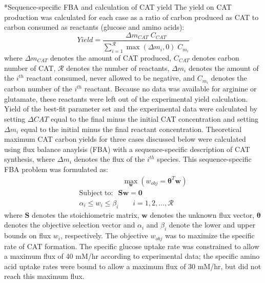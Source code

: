 \documentclass[12pt]{article}
\makeatletter
\renewcommand\subsection{\@startsection
	{subsection}{2}{0mm}
	{-0.05in}
	{-0.5\baselineskip}
	{\normalfont\normalsize\bfseries}}
\makeatother
\begin{document}
\subsection*{Sequence-specific FBA and calculation of CAT yield}
The yield on CAT production was calculated for each case as a ratio of carbon produced as CAT to carbon consumed as reactants (glucose and amino acids):
\begin{equation}\label{eqn:yield-definition}
	Yield=\frac{\Delta m_{CAT}\;C_{CAT}}{\sum_{i=1}^{\mathcal{R}}\max(\Delta m_{i},0)\;C_{m_i}}
\end{equation}
where $\Delta m_{CAT}$ denotes the amount of CAT produced, $C_{CAT}$ denotes carbon number of CAT, $\mathcal{R}$ denotes the number of reactants, $\Delta m_{i}$ denotes the amount of the $i^{th}$ reactant consumed, never allowed to be negative, and $C_{m_i}$ denotes the carbon number of the $i^{th}$ reactant.
Because no data was available for arginine or glutamate, these reactants were left out of the experimental yield calculation.
Yield of the best-fit parameter set and the experimental data were calculated by setting $\Delta CAT$ equal to the final minus the initial CAT concentration and setting $\Delta m_{i}$ equal to the initial minus the final reactant concentration.
Theoretical maximum CAT carbon yields for three cases discussed below were calculated using flux balance anaylsis (FBA) with a sequence-specific description of CAT synthesis, where $\Delta m_{i}$ denotes the flux of the $i^{th}$ species.
This sequence-specific FBA \citep{Allen:2003aa} problem was formulated as:
\begin{equation}\nonumber
 \begin{multlined}
	\qquad \qquad \qquad \max_{\boldsymbol{w}}{} \! \left( w_{obj} = \mathbf{\boldsymbol{\theta}}^T \boldsymbol{w} \right) \\
	\mathrm{Subject \; to:}
	 \; \; \mathbf{S}\mathbf{w}=\mathbf{0} \\
\alpha_i \leq w_i \leq \beta_i  \qquad i=1,2,\hdots,\mathcal{R}
 \end{multlined}
\end{equation}
where $\mathbf{S}$ denotes the stoichiometric matrix, $\mathbf{w}$ denotes the unknown flux vector, $\boldsymbol{\theta}$ denotes the objective selection vector
and $\alpha_i$ and $\beta_i$ denote the lower and upper bounds on flux $w_{i}$, respectively.
The objective $w_{obj}$ was to maximize the specific rate of CAT formation.
The specific glucose uptake rate was constrained to allow a maximum flux of 40 mM/hr according to experimental data; the specific amino acid uptake rates were bound to allow a maximum flux of 30 mM/hr, but did not reach this maximum flux.
\end{document}
